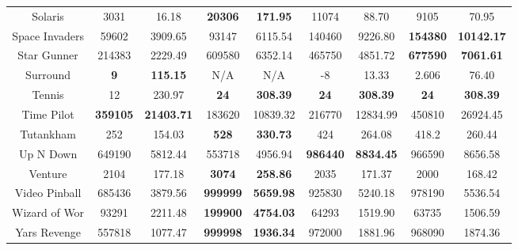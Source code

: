 \documentclass[nohyperref]{article}
\newcommand{\best}[1]{\textbf{#1}}
\theoremstyle{plain}
\begin{document}
\begin{table}[!hb]
\begin{center}
\begin{tabular}{|c |c c| c c| c c |c c|}
 Solaris        &3031          &16.18                   &\textbf{20306}        &\textbf{171.95}                & 11074             &88.70               &9105            &70.95\\
 Space Invaders &59602         &3909.65                &93147                 &6115.54                        & 140460     &9226.80       &\textbf{154380}          &\textbf{10142.17}\\
 Star Gunner    &214383        &2229.49                &609580       &6352.14               & 465750     &4851.72                     &\textbf{677590}	          &\textbf{7061.61}\\
 Surround       &\textbf{9}    &\textbf{115.15}                 &N/A                    &N/A                  & -8        &13.33                        &2.606           &76.40\\
 Tennis         &12            &230.97                 &\best{24}              &\best{308.39}                  & \best{24}         &\best{308.39}       &\textbf{24}    &\textbf{308.39}     \\
 Time Pilot     &\textbf{359105} &\textbf{21403.71}                   &183620                &10839.32       & 216770     &12834.99                     &450810	          &26924.45\\
 Tutankham      &252           &154.03                 &\textbf{528}           &\textbf{330.73}                & 424               &264.08              &418.2           &260.44\\
 Up N Down      &649190        &5812.44                &553718                &4956.94                        & \best{986440}     &\best{8834.45}       &966590          &8656.58    \\
 Venture        &2104          &177.18                 &\textbf{3074}         &\textbf{258.86}                & 2035              &171.37               &2000	            &168.42\\
 Video Pinball  &685436        &3879.56                &\textbf{999999}       &\textbf{5659.98}               & 925830            &5240.18              &978190          &5536.54\\
 Wizard of Wor  &93291         &2211.48                &\textbf{199900}       &\textbf{4754.03}               & 64293             &1519.90              &63735           &1506.59\\
 Yars Revenge   &557818        &1077.47                &\textbf{999998}       &\textbf{1936.34}               & 972000            &1881.96              &968090          &1874.36\\

\end{tabular}
\end{center}
\end{table}
\end{document}
